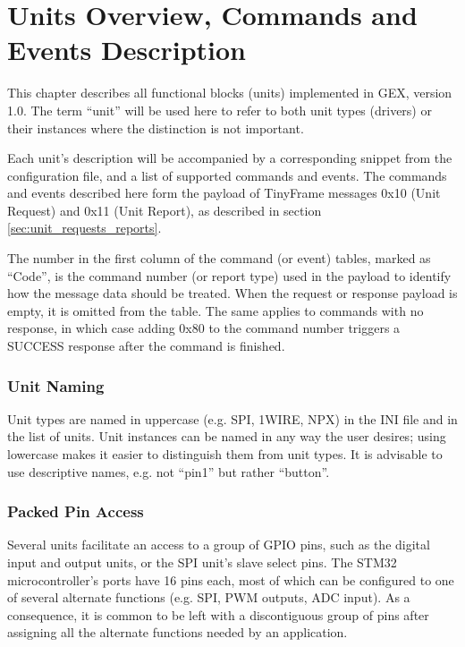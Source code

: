 \chapter{Units Overview, Commands and Events Description} \label{sec:units-overview}

This chapter describes all functional blocks (units) implemented in GEX, version 1.0. The term ``unit'' will be used here to refer to both unit types (drivers) or their instances where the distinction is not important.

Each unit's description will be accompanied by a corresponding snippet from the configuration file, and a list of supported commands and events. The commands and events described here form the payload of TinyFrame messages 0x10 (Unit Request) and 0x11 (Unit Report), as described in section \ref{sec:unit_requests_reports}. 

The number in the first column of the command (or event) tables, marked as ``Code'', is the command number (or report type) used in the payload to identify how the message data should be treated. When the request or response payload is empty, it is omitted from the table. The same applies to commands with no response, in which case adding 0x80 to the command number triggers a SUCCESS response after the command is finished.

\subsection{Unit Naming}

Unit types are named in uppercase (e.g. SPI, 1WIRE, NPX) in the INI file and in the list of units. Unit instances can be named in any way the user desires; using lowercase makes it easier to distinguish them from unit types. It is advisable to use descriptive names, e.g. not ``pin1'' but rather ``button''.

\subsection{Packed Pin Access} \label{sec:packedpins}

Several units facilitate an access to a group of GPIO pins, such as the digital input and output units, or the SPI unit's slave select pins. The STM32 microcontroller's ports have 16 pins each, most of which can be configured to one of several alternate functions (e.g. SPI, PWM outputs, ADC input). As a consequence, it is common to be left with a discontiguous group of pins after assigning all the alternate functions needed by an application.

